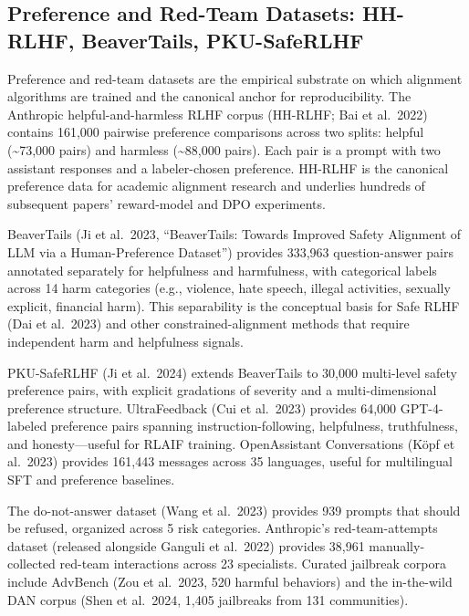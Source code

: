 \subsection{Preference and Red-Team Datasets: HH-RLHF, BeaverTails, PKU-SafeRLHF}\label{preference-and-red-team-datasets-hh-rlhf-beavertails-pku-saferlhf}

Preference and red-team datasets are the empirical substrate on which alignment algorithms are trained and the canonical anchor for reproducibility. The Anthropic helpful-and-harmless RLHF corpus (HH-RLHF; Bai et al.~2022) contains 161,000 pairwise preference comparisons across two splits: helpful (\textasciitilde73,000 pairs) and harmless (\textasciitilde88,000 pairs). Each pair is a prompt with two assistant responses and a labeler-chosen preference. HH-RLHF is the canonical preference data for academic alignment research and underlies hundreds of subsequent papers' reward-model and DPO experiments.

BeaverTails (Ji et al.~2023, ``BeaverTails: Towards Improved Safety Alignment of LLM via a Human-Preference Dataset'') provides 333,963 question-answer pairs annotated separately for helpfulness and harmfulness, with categorical labels across 14 harm categories (e.g., violence, hate speech, illegal activities, sexually explicit, financial harm). This separability is the conceptual basis for Safe RLHF (Dai et al.~2023) and other constrained-alignment methods that require independent harm and helpfulness signals.

PKU-SafeRLHF (Ji et al.~2024) extends BeaverTails to 30,000 multi-level safety preference pairs, with explicit gradations of severity and a multi-dimensional preference structure. UltraFeedback (Cui et al.~2023) provides 64,000 GPT-4-labeled preference pairs spanning instruction-following, helpfulness, truthfulness, and honesty---useful for RLAIF training. OpenAssistant Conversations (Köpf et al.~2023) provides 161,443 messages across 35 languages, useful for multilingual SFT and preference baselines.

The do-not-answer dataset (Wang et al.~2023) provides 939 prompts that should be refused, organized across 5 risk categories. Anthropic's red-team-attempts dataset (released alongside Ganguli et al.~2022) provides 38,961 manually-collected red-team interactions across 23 specialists. Curated jailbreak corpora include AdvBench (Zou et al.~2023, 520 harmful behaviors) and the in-the-wild DAN corpus (Shen et al.~2024, 1,405 jailbreaks from 131 communities).

